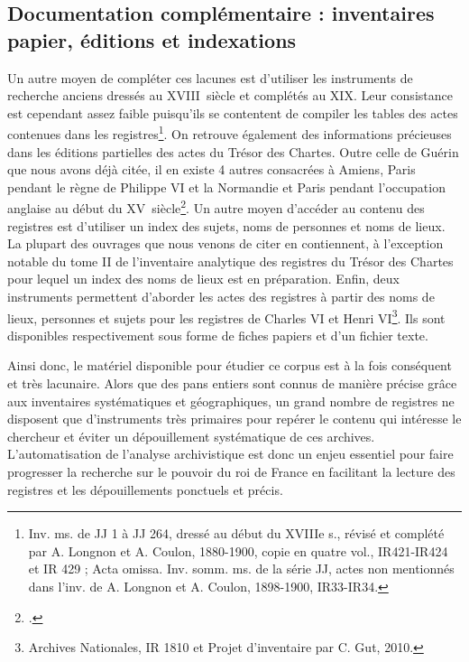 \documentclass[a4paper,12pt,twoside]{book}
\begin{document}
	\subsection{Documentation complémentaire : inventaires papier, éditions et indexations}
	
	Un autre moyen de compléter ces lacunes est d'utiliser les instruments de recherche anciens dressés au XVIII\ieme\ siècle et complétés au XIX\ieme. Leur consistance est cependant assez faible puisqu'ils se contentent de compiler les tables des actes contenues dans les registres\footnote{Inv. ms. de JJ 1 à JJ 264, dressé au début du XVIIIe s., révisé et complété par A. Longnon et A. Coulon, 1880-1900, copie en quatre vol., IR421-IR424 et IR 429 ; Acta omissa. Inv. somm. ms. de la série JJ, actes non mentionnés dans	l’inv. de A. Longnon et A. Coulon, 1898-1900, IR33-IR34.}. On retrouve également des informations précieuses dans les éditions partielles des actes du Trésor des Chartes. Outre celle de Guérin que nous avons déjà citée, il en existe 4 autres consacrées à Amiens, Paris pendant le règne de Philippe VI et la Normandie et Paris pendant l'occupation anglaise au début du XV\ieme\ siècle\footcite{guerin_actes_1881, viard_documents_1899, longnon_paris_1878, le_cacheux_actes_1907, maugis_documents_1908}. Un autre moyen d'accéder au contenu des registres est d'utiliser un index des sujets, noms de personnes et noms de lieux. La plupart des ouvrages que nous venons de citer en contiennent, à l'exception notable du tome II de l'inventaire analytique des registres du Trésor des Chartes pour lequel un index des noms de lieux est en préparation. Enfin, deux instruments permettent d'aborder les actes des registres à partir des noms de lieux, personnes et sujets pour les registres de Charles VI et Henri VI\footnote{Archives Nationales, IR 1810 et Projet d'inventaire par C. Gut, 2010.}. Ils sont disponibles respectivement sous forme de fiches papiers et d'un fichier texte. 
	
	Ainsi donc, le matériel disponible pour étudier ce corpus est à la fois conséquent et très lacunaire. Alors que des pans entiers sont connus de manière précise grâce aux inventaires systématiques et géographiques, un grand nombre de registres ne disposent que d'instruments très primaires pour repérer le contenu qui intéresse le chercheur et éviter un dépouillement systématique de ces archives. L'automatisation de l'analyse archivistique est donc un enjeu essentiel pour faire progresser la recherche sur le pouvoir du roi de France en facilitant la lecture des registres et les dépouillements ponctuels et précis.
\end{document}
